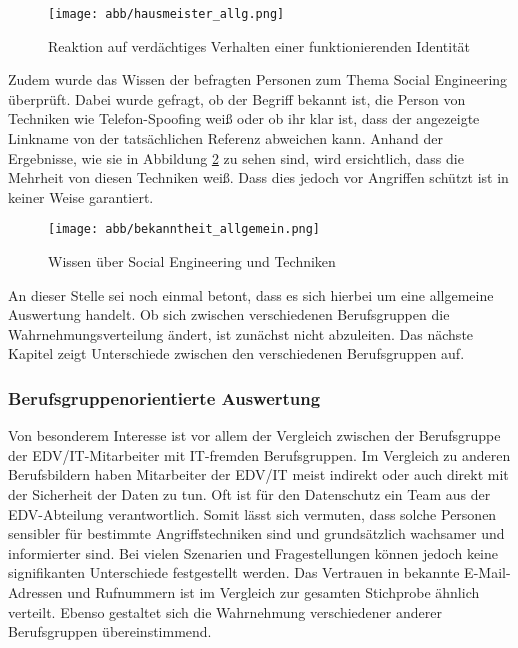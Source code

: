 \begin{figure}[htbp]
	\centering
	\texttt{[image: abb/hausmeister\_allg.png]}
	\caption{Reaktion auf verdächtiges Verhalten einer funktionierenden Identität}
	\label{fig:hausmeister_allg}
\end{figure}

Zudem wurde das Wissen der befragten Personen zum Thema Social Engineering überprüft.
Dabei wurde gefragt, ob der Begriff  bekannt ist, die Person von Techniken wie Telefon-Spoofing weiß oder ob ihr klar ist, dass der angezeigte Linkname von der tatsächlichen Referenz abweichen kann.
Anhand der Ergebnisse, wie sie in Abbildung \ref{fig:social_engineering_wissen} zu sehen sind, wird ersichtlich, dass die Mehrheit von diesen Techniken weiß.
Dass dies jedoch vor Angriffen schützt ist in keiner Weise garantiert.

\begin{figure}[htbp]
	\centering
	\texttt{[image: abb/bekanntheit\_allgemein.png]}
	\caption{Wissen über Social Engineering und Techniken}
	\label{fig:social_engineering_wissen}
\end{figure}

An dieser Stelle sei noch einmal betont, dass es sich hierbei um eine allgemeine Auswertung handelt.
Ob sich zwischen verschiedenen Berufsgruppen die Wahrnehmungsverteilung ändert, ist zunächst nicht abzuleiten.
Das nächste Kapitel zeigt Unterschiede zwischen den verschiedenen Berufsgruppen auf.



\subsubsection{Berufsgruppenorientierte Auswertung}\label{ref:berufsgruppenorientierte-auswertung}

Von besonderem Interesse ist vor allem der Vergleich zwischen der Berufsgruppe der EDV/IT-Mitarbeiter mit IT-fremden Berufsgruppen.
Im Vergleich zu anderen Berufsbildern haben Mitarbeiter der EDV/IT meist indirekt oder auch direkt mit der Sicherheit der Daten zu tun.
Oft ist für den Datenschutz ein Team aus der EDV-Abteilung verantwortlich.
Somit lässt sich vermuten, dass solche Personen sensibler für bestimmte Angriffstechniken sind und grundsätzlich wachsamer und informierter sind.
Bei vielen Szenarien und Fragestellungen können jedoch keine signifikanten Unterschiede festgestellt werden.
Das Vertrauen in bekannte E-Mail-Adressen und Rufnummern ist im Vergleich zur gesamten Stichprobe ähnlich verteilt.
Ebenso gestaltet sich die Wahrnehmung verschiedener anderer Berufsgruppen übereinstimmend.

